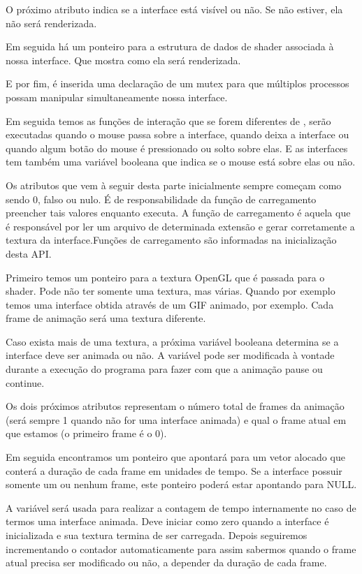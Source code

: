 O próximo atributo indica se a interface está visível ou não. Se não
estiver, ela não será renderizada.

Em seguida há um ponteiro para a estrutura de dados de shader
associada à nossa interface. Que mostra como ela será renderizada.

E por fim, é inserida uma declaração de um mutex para que múltiplos
processos possam manipular simultaneamente nossa interface.

Em seguida temos as funções de interação que se forem diferentes
de , serão executadas quando o mouse passa sobre a
interface, quando deixa a interface ou quando algum botão do mouse é
pressionado ou solto sobre elas. E as interfaces tem também uma
variável booleana que indica se o mouse está sobre elas ou não.

Os atributos que vem à seguir desta parte inicialmente sempre começam
como sendo 0, falso ou nulo. É de responsabilidade da função de
carregamento preencher tais valores enquanto executa. A função de
carregamento é aquela que é responsável por ler um arquivo de
determinada extensão e gerar corretamente a textura da
interface.Funções de carregamento são informadas na inicialização
desta API.

Primeiro temos um ponteiro para a textura OpenGL que é passada para o
shader. Pode não ter somente uma textura, mas várias. Quando por
exemplo temos uma interface obtida através de um GIF animado, por
exemplo. Cada frame de animação será uma textura diferente.

Caso exista mais de uma textura, a próxima variável booleana determina
se a interface deve ser animada ou não. A variável pode ser modificada
à vontade durante a execução do programa para fazer com que a animação
pause ou continue.

Os dois próximos atributos representam o número total de frames da
animação (será sempre 1 quando não for uma interface animada) e qual o
frame atual em que estamos (o primeiro frame é o 0).

Em seguida encontramos um ponteiro que apontará para um vetor alocado
que conterá a duração de cada frame em unidades de tempo. Se a
interface possuir somente um ou nenhum frame, este ponteiro poderá
estar apontando para NULL.

A variável  será usada para realizar a contagem de
tempo internamente no caso de termos uma interface animada. Deve
iniciar como zero quando a interface é inicializada e sua textura
termina de ser carregada. Depois seguiremos incrementando o contador
automaticamente para assim sabermos quando o frame atual precisa ser
modificado ou não, a depender da duração de cada frame.

